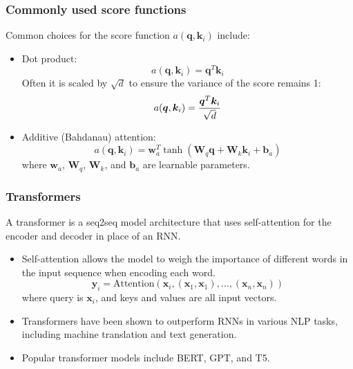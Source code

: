 \documentclass[smaller]{beamer}
\begin{document}
\begin{frame}
  \frametitle{Commonly used score functions}\pe
  Common choices for the score function $ a(\bm q, \bm k_i)$ include:\pe
  \begin{itemize}
  \item Dot product: \pe
    \begin{equation}
      a(\bm q, \bm k_i) = \bm q^{T}\bm k_i
    \end{equation} \pe
    Often it is scaled by $\sqrt{d}$ to ensure the variance of the score remains 1: \pe
    \begin{equation}
      a(\bm q, \bm k_i) = \frac{\bm q^{T}\bm k_i}{\sqrt{d}}
    \end{equation}
\pe
  \item Additive (Bahdanau) attention: \pe
    \begin{equation}
      a(\bm q, \bm k_i) = \bm w_{a}^{T}\tanh(\bm W_{q}\bm q + \bm W_{k}\bm k_i + \bm b_a)
    \end{equation}
    \pe
    where $\bm w_a$, $\bm W_q$, $\bm W_k$, and $\bm b_a$ are learnable parameters.
  \end{itemize} 
  

\end{frame}

\begin{frame}
  \frametitle{Transformers}\pe

  A transformer is a seq2seq model architecture that uses self-attention for the encoder and decoder in place of
  an RNN.\pe
\begin{itemize}
  \item Self-attention allows the model to weigh the importance of different words in the input sequence when encoding each word.\pe
\begin{equation}
  \bm y_i = \text{Attention}(\bm x_i, (\bm x_1, \bm x_1), \ldots, (\bm x_n, \bm x_n))
\end{equation}
\pe where query is $\bm x_i$, and keys and values are all input vectors.\pe
  \item Transformers have been shown to outperform RNNs in various NLP tasks, including machine translation and text generation.\pe
  \item Popular transformer models include BERT, GPT, and T5.
\end{itemize}
\end{frame}
\end{document}
